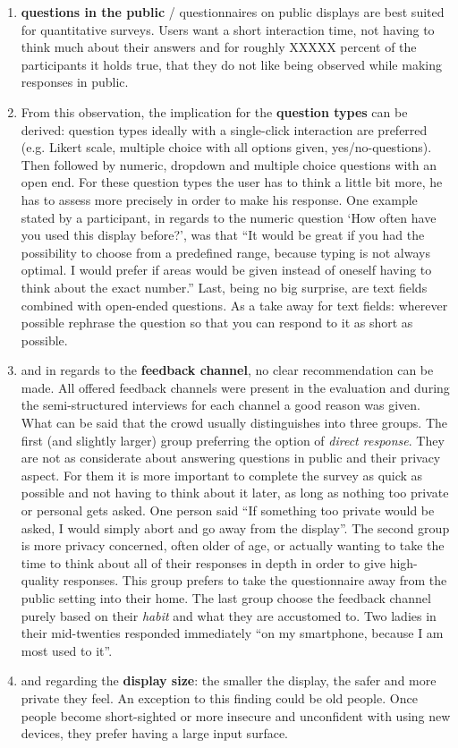 	\begin{enumerate}
	\item \textbf{questions in the public} / questionnaires on public displays are best suited for quantitative surveys. Users want a short interaction time, not having to think much about their answers and for roughly XXXXX percent of the participants it holds true, that they do not like being observed while making responses in public.

	\item From this observation, the implication for the \textbf{question types} can be derived: question types ideally with a single-click interaction are preferred (e.g. Likert scale, multiple choice with all options given, yes/no-questions). Then followed by numeric, dropdown and multiple choice questions with an open end. For these question types the user has to think a little bit more, he has to assess more precisely in order to make his response. One example stated by a participant, in regards to the numeric question `How often have you used this display before?', was that ``It would be great if you had the possibility to choose from a predefined range, because typing is not always optimal. I would prefer if areas would be given instead of oneself having to think about the exact number.'' Last, being no big surprise, are text fields combined with open-ended questions. As a take away for text fields: wherever possible rephrase the question so that you can respond to it as short as possible.

	\item and in regards to the \textbf{feedback channel}, no clear recommendation can be made. All offered feedback channels were present in the evaluation and during the semi-structured interviews for each channel a good reason was given. What can be said that the crowd usually distinguishes into three groups. The first (and slightly larger) group preferring the option of \textit{direct response}. They are not as considerate about answering questions in public and their privacy aspect. For them it is more important to complete the survey as quick as possible and not having to think about it later, as long as nothing too private or personal gets asked. One person said ``If something too private would be asked, I would simply abort and go away from the display''. The second group is more privacy concerned, often older of age, or actually wanting to take the time to think about all of their responses in depth in order to give high-quality responses. This group prefers to take the questionnaire away from the public setting into their home. The last group choose the feedback channel purely based on their \textit{habit} and what they are accustomed to. Two ladies in their mid-twenties responded immediately ``on my smartphone, because I am most used to it''.

	\item and regarding the \textbf{display size}: the smaller the display, the safer and more private they feel. An exception to this finding could be old people. Once people become short-sighted or more insecure and unconfident with using new devices, they prefer having a large input surface.

	\end{enumerate}






